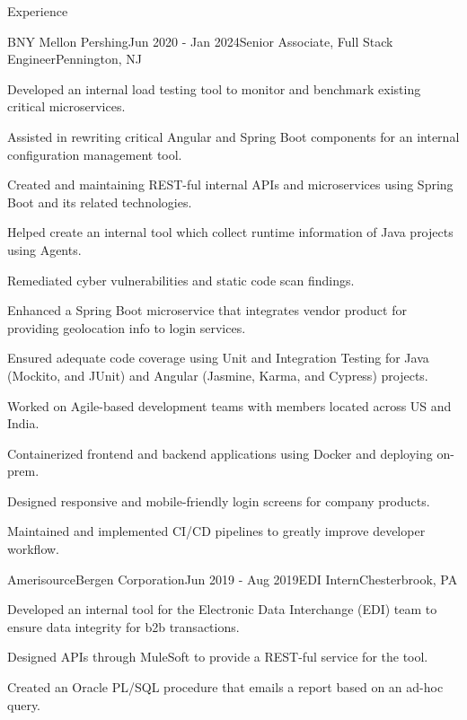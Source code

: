 \documentclass[
11pt, %
]{resume} %
\begin{document}
\begin{rSection}{Experience}

	\begin{rSubsection}{BNY Mellon \textbar{} Pershing}{Jun 2020 - Jan 2024}{Senior Associate, Full Stack Engineer}{Pennington, NJ}
		\item Developed an internal load testing tool to monitor and benchmark existing critical microservices.
		\item Assisted in rewriting critical Angular and Spring Boot components for an internal configuration management tool.
		\item Created and maintaining REST-ful internal APIs and microservices using Spring Boot and its related technologies.
		\item Helped create an internal tool which collect runtime information of Java projects using Agents.
		\item Remediated cyber vulnerabilities and static code scan findings.
		\item Enhanced a Spring Boot microservice that integrates vendor product for providing geolocation info to login services.
		\item Ensured adequate code coverage using Unit and Integration Testing for Java (Mockito, and JUnit) and Angular (Jasmine, Karma, and Cypress) projects.
		\item Worked on Agile-based development teams with members located across US and India.
		\item Containerized frontend and backend applications using Docker and deploying on-prem.
		\item Designed responsive and mobile-friendly login screens for company products.
		\item Maintained and implemented CI/CD pipelines to greatly improve developer workflow.
	\end{rSubsection}


	\begin{rSubsection}{AmerisourceBergen Corporation}{Jun 2019 - Aug 2019}{EDI Intern}{Chesterbrook, PA}
		\item Developed an internal tool for the Electronic Data Interchange (EDI) team to ensure data integrity for b2b transactions.
		\item Designed APIs through MuleSoft to provide a REST-ful service for the tool.
		\item Created an Oracle PL/SQL procedure that emails a report based on an ad-hoc query.
	\end{rSubsection}


\end{rSection}
\end{document}
